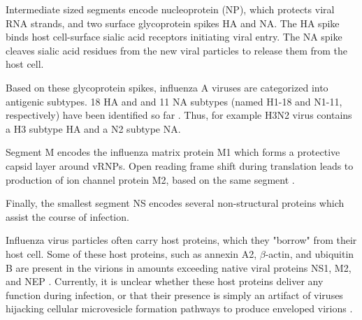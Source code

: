 Intermediate sized segments encode nucleoprotein (NP), which protects viral RNA strands, and two surface glycoprotein spikes HA and NA. The HA spike binds host cell-surface sialic acid receptors initiating viral entry. The NA spike cleaves sialic acid residues from the new viral particles to release them from the host cell.

Based on these glycoprotein spikes, influenza A viruses are categorized into antigenic subtypes. 18 HA and and 11 NA subtypes (named H1-18 and N1-11, respectively) have been identified so far \cite{InfluenzaAAntigenicSubtypes}. Thus, for example H3N2 virus contains a H3 subtype HA and a N2 subtype NA.

Segment M encodes the influenza matrix protein M1 which forms a protective capsid layer around vRNPs. Open reading frame shift during translation leads to production of ion channel protein M2, based on the same segment \cite{dubois2014influenza}.

Finally, the smallest segment NS encodes several non-structural proteins which assist the course of infection.

Influenza virus particles often carry host proteins, which they "borrow" from their host cell. Some of these host proteins, such as annexin A2, $\beta$-actin, and ubiquitin B are present in the virions in amounts exceeding native viral proteins NS1, M2, and NEP \cite{hutchinson2014conserved}. Currently, it is unclear whether these host proteins deliver any function during infection, or that their presence is simply an artifact of viruses hijacking cellular microvesicle formation pathways to produce enveloped virions \cite{hutchinson2014conserved}.